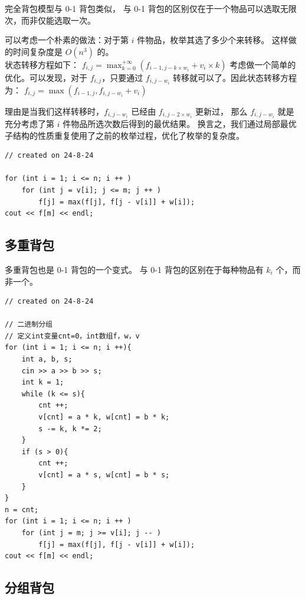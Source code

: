 \documentclass[a4paper,12pt]{article}
\begin{document}
\noindent 完全背包模型与 0-1 背包类似，
与 0-1 背包的区别仅在于一个物品可以选取无限次，而非仅能选取一次。

\noindent 可以考虑一个朴素的做法：对于第 \( i \) 件物品，枚举其选了多少个来转移。
这样做的时间复杂度是 \( O(n^3) \) 的。
\\

\noindent 状态转移方程如下：
\(f_{i,j} = \max_{k=0}^{+\infty} (f_{i-1,j-k \times w_i} + v_i \times k)\)
考虑做一个简单的优化。可以发现，对于 \( f_{i,j} \)，只要通过 \( f_{i,j-w_i} \) 转移就可以了。因此状态转移方程为：
\(f_{i,j} = \max(f_{i-1,j}, f_{i,j-w_i} + v_i)\)


\noindent 理由是当我们这样转移时，\( f_{i,j-w_i} \) 已经由 \( f_{i,j-2 \times w_i} \) 更新过，
那么 \( f_{i,j-w_i} \) 就是充分考虑了第 \( i \) 件物品所选次数后得到的最优结果。
换言之，我们通过局部最优子结构的性质重复使用了之前的枚举过程，优化了枚举的复杂度。

\begin{lstlisting}
// created on 24-8-24

for (int i = 1; i <= n; i ++ )
    for (int j = v[i]; j <= m; j ++ )
        f[j] = max(f[j], f[j - v[i]] + w[i]);
cout << f[m] << endl;    
\end{lstlisting}

\subsection{多重背包}

\noindent 多重背包也是 0-1 背包的一个变式。
与 0-1 背包的区别在于每种物品有 \(k_i\) 个，而非一个。
\\


\begin{lstlisting}
// created on 24-8-24

// 二进制分组
// 定义int变量cnt=0，int数组f，w，v
for (int i = 1; i <= n; i ++){
    int a, b, s; 
    cin >> a >> b >> s;
    int k = 1;
    while (k <= s){
        cnt ++;
        v[cnt] = a * k, w[cnt] = b * k;
        s -= k, k *= 2;
    }
    if (s > 0){
        cnt ++;
        v[cnt] = a * s, w[cnt] = b * s;
    }
}
n = cnt;
for (int i = 1; i <= n; i ++ )
    for (int j = m; j >= v[i]; j -- )
        f[j] = max(f[j], f[j - v[i]] + w[i]);
cout << f[m] << endl;    
\end{lstlisting}

\subsection{分组背包}
\end{document}
